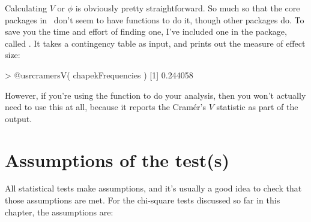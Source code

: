 Calculating $V$ or $\phi$ is obviously pretty straightforward. So much so that the core packages in \R\ don't seem to have functions to do it, though other packages do. To save you the time and effort of finding one, I've included one in the  package, called . It takes a contingency table as input, and prints out the measure of effect size:
\begin{rblock1}
> @usr{cramersV( chapekFrequencies )}
[1] 0.244058
\end{rblock1}
However, if you're using the  function to do your analysis, then you won't actually need to use this at all, because it reports the Cram\'er's  $V$ statistic as part of the output. 



\section{Assumptions of the test(s)~\label{sec:chisqassumptions}}

All statistical tests make assumptions, and it's usually a good idea to check that those assumptions are met. For the chi-square tests discussed so far in this chapter, the assumptions are:

